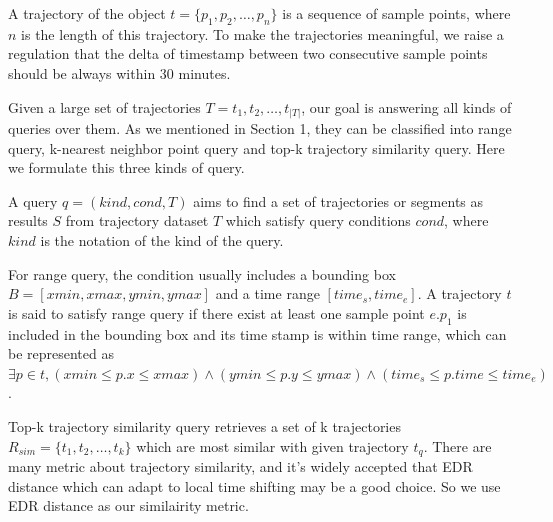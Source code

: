 \documentclass[conference]{IEEEtran}
\begin{document}
	\begin{define}[trajectory]
		A trajectory of the object $t=\{p_{1},p_{2},\ldots,p_{n}\}$ is a sequence of sample points, where $n$ is the length of this trajectory. To make the trajectories meaningful, we raise a regulation that the delta of timestamp between two consecutive sample points should be always within 30 minutes. 
	\end{define}

	Given a large set of trajectories $T={t_{1},t_{2},\ldots,t_{|T|}}$, our goal is answering all kinds of queries over them. As we mentioned in Section 1, they can be classified into range query, k-nearest neighbor point query and top-k trajectory similarity query. Here we formulate this three kinds of query.
	
	\begin{define}[query]
		A query $q=(kind,cond,T)$ aims to find a set of trajectories or segments as results $S$ from trajectory dataset $T$ which satisfy query conditions $cond$, where $kind$ is the notation of the kind of the query.
	\end{define}
	
	For range query, the condition usually includes a bounding box $B=[xmin,xmax,ymin,ymax]$ and a time range $[time_{s},time_{e}]$. A trajectory $t$ is said to satisfy range query if there exist at least one sample point $e.p_{1}$ is included in the bounding box and its time stamp is within time range, which can be represented as $\exists p\in t, (xmin \leq p.x \leq xmax) \wedge (ymin \leq p.y \leq ymax) \wedge (time_{s} \leq p.time \leq time_{e})$. 

	
	
	
	Top-k trajectory similarity query retrieves a set of k trajectories $R_{sim}=\{t_{1},t_{2},\ldots ,t_{k}\}$ which are most similar with given trajectory $t_{q}$. There are many metric about trajectory similarity, and it's widely accepted that EDR distance\cite{DBLP:conf/sigmod/ChenOO05} which can adapt to local time shifting may be a good choice. So we use EDR distance as our similairity metric.
	
\end{document}
